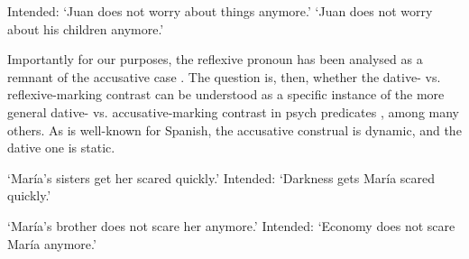 \documentclass[output=paper,colorlinks,citecolor=brown,nonflat]{langsci/langscibook}
\begin{document}
\ea%
    \label{ex:fabregas:6}
    \glt    Intended: ‘Juan does not worry about things anymore.’
     \glt    ‘Juan does not worry about his children anymore.’
    \z
\z

Importantly for our purposes, the reflexive pronoun has been analysed as a remnant of the accusative case \citep{Medová2009}. The question is, then, whether the dative- vs. reflexive-marking contrast can be understood as a specific instance of the more general dative- vs. accusative-marking contrast in psych predicates \citep{FernándezOrdóñez1999, Landau2010, CifuentesHonrubia2015, FábregasJiménezFernándezTubinoBlanco2017}, among many others. As is well-known for Spanish, the accusative construal is dynamic, and the dative one is static.

\ea%
    \label{ex:fabregas:7}
        \glt    ‘María's sisters get her scared quickly.’
     \glt   Intended:  ‘Darkness gets María scared quickly.’
    \z
\z

\ea%
    \label{ex:fabregas:8}
     \glt   ‘María's brother does not scare her anymore.’
    \glt   Intended:  ‘Economy does not scare María anymore.’
    \z
\z
\end{document}
